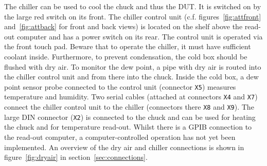 \documentclass[a4paper]{article}
\begin{document}
The chiller can be used to cool the chuck and thus the DUT.
It is switched on by the large red switch on its front.
The chiller control unit (c.f. figures~\ref{fig:attfront} and~\ref{fig:attback} for front and back views) is located on the shelf above the read-out computer and has a power switch on its rear.
The control unit is operated via the front touch pad.
Beware that to operate the chiller, it must have sufficient coolant inside.
Furthermore, to prevent condensation, the cold box should be flushed with dry air.
To monitor the dew point, a pipe with dry air is routed into the chiller control unit and from there into the chuck.
Inside the cold box, a dew point sensor probe connected to the control unit (connector {\tt X5}) measures temperature and humidity.
Two serial cables (attached at connectors {\tt X4} and {\tt X7}) connect the chiller control unit to the chiller (connectors there {\tt X8} and {\tt X9}).
The large DIN connector ({\tt X2}) is connected to the chuck and can be used for heating the chuck and for temperature read-out.
Whilst there is a GPIB connection to the read-out computer, a computer-controlled operation has not yet been implemented.
An overview of the dry air and chiller connections is shown in figure~\ref{fig:dryair} in section~\ref{sec:connections}.\\
\end{document}
